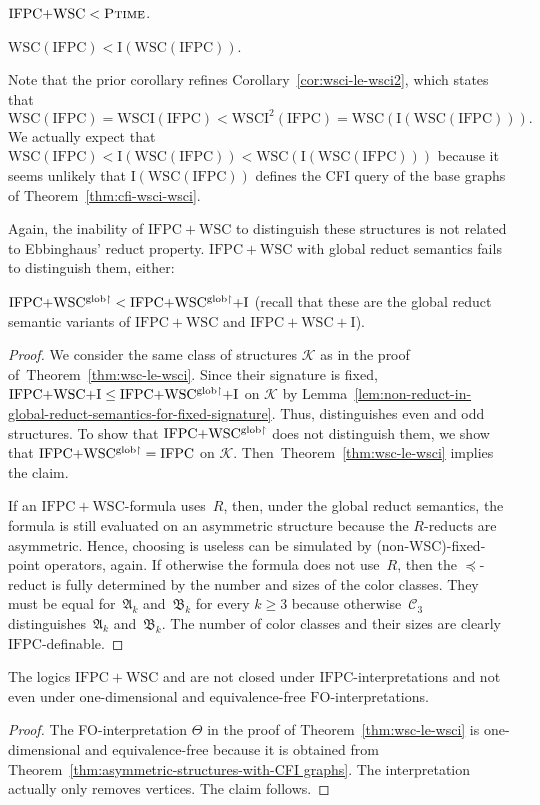 \documentclass[]{lmcs}
\newcommand{\interpret}{\Theta}
\newcommand{\spleq}{\preceq}
\newcommand{\StructA}{\mathfrak{A}}
\newcommand{\StructB}{\mathfrak{B}}
\newcommand{\GraphClass}{\mathcal{K}}
\newcommand{\PTime}{\textsc{Ptime}}
\newcommand{\FO}{\ensuremath{\mathrm{FO}}}
\newcommand{\IFPC}{\ensuremath{\mathrm{IFPC}}}
\newcommand{\IFPCWSC}{\ensuremath{\mathrm{IFPC{+}WSC}}}
\newcommand{\IFPCWSCI}{\ensuremath{\mathrm{IFPC{+}WSC{+}I}}}
\newcommand{\Ck}[1]{\mathcal{C}_{#1}}
\newcommand{\WSCof}[1]{\mathrm{WSC}(#1)}
\newcommand{\Iof}[1]{\mathrm{I}(#1)}
\newcommand{\WSCIof}[1]{\mathrm{WSCI}(#1)}
\newcommand{\WSCIkof}[2]{\mathrm{WSCI}^{#1}(#2)}
\begin{document}
\begin{cor}
	$\IFPCWSC{} < \PTime{}$.
\end{cor}

\begin{cor}
	$\WSCof{\IFPC} < \Iof{\WSCof{\IFPC{}}}$.
\end{cor}
\noindent Note that the prior corollary refines Corollary~\ref{cor:wsci-le-wsci2},
which states that \[\WSCof{\IFPC} = \WSCIof{\IFPC{}} < \WSCIkof{2}{\IFPC{}} = \WSCof{\Iof{\WSCof{\IFPC{}}}}.\]
We actually expect that $\WSCof{\IFPC} < \Iof{\WSCof{\IFPC{}}} < \WSCof{\Iof{\WSCof{\IFPC{}}}}$
because it seems unlikely that $\Iof{\WSCof{\IFPC{}}}$
defines the CFI query of the base graphs of Theorem~\ref{thm:cfi-wsci-wsci}.

Again, the inability of $\IFPCWSC{}$ to distinguish these structures
is not related to Ebbinghaus' reduct property.
$\IFPCWSC{}$ with global reduct semantics fails to distinguish them, either:
\begin{lem}
 $ \mathrm{IFPC{+}WSC^{\mathrm{glob}\upharpoonright}}  <  \mathrm{IFPC{+}WSC^{\mathrm{glob}\upharpoonright}{+}I} $ (recall that these are the global reduct semantic variants of $\IFPCWSC$ and $\IFPCWSCI$).
\end{lem}
\begin{proof}
	We consider the same class of structures $\GraphClass$
	as in the proof of~Theorem~\ref{thm:wsc-le-wsci}.
	Since their signature is fixed,
	$\IFPCWSCI \leq \IFPCWSCIglob{}$ on $\GraphClass$ by Lemma~\ref{lem:non-reduct-in-global-reduct-semantics-for-fixed-signature}.
	Thus, \IFPCWSCIglob{} distinguishes even and odd structures.
	To show that $ \mathrm{IFPC{+}WSC^{\mathrm{glob}\upharpoonright}} $ does not distinguish them,
	we show that $\IFPCWSCglob = \IFPC$ on $\GraphClass$.
	Then~Theorem~\ref{thm:wsc-le-wsci} implies the claim.
	
	If an \IFPCWSC{}-formula uses~$R$,
	then, under the global reduct semantics, the formula is still evaluated on an asymmetric structure because the $R$-reducts are asymmetric.
	Hence, choosing is useless can be simulated by (non-WSC)-fixed-point operators, again.
	If otherwise the formula does not use~$R$,
	then the $\spleq$-reduct 
	is fully determined by the number and sizes of the color classes.
	They must be equal for~$\StructA_k$ and~$\StructB_k$ for every $k \geq 3$ because otherwise~$\Ck{3}$ distinguishes~$\StructA_k$ and~$\StructB_k$.
	The number of color classes and their sizes are clearly \IFPC{}-definable.
\end{proof}


\begin{cor}
	The logics \IFPCWSC{} and \IFPCWSCglob{} are not closed under \IFPC{}-interpretations
	and not even under one-dimensional and equivalence-free \FO{}-interpretations.
\end{cor}
\begin{proof}
	The FO-interpretation $\interpret$ in the proof of Theorem~\ref{thm:wsc-le-wsci} is one-dimensional and equivalence-free because it is obtained from Theorem~\ref{thm:asymmetric-structures-with-CFI graphs}.
	The interpretation actually only removes vertices.
	The claim follows.
\end{proof}
\end{document}
